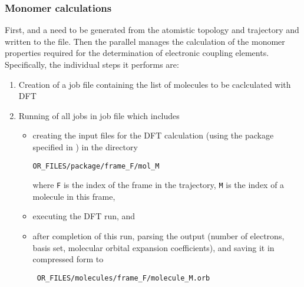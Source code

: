 \subsubsection{Monomer calculations}
\label{sec:edft}
First,  and a  need to be generated from the atomistic topology and trajectory and written to the \sqlstate file. Then the parallel  \calculator manages the calculation of the monomer properties required for the determination of electronic coupling elements. Specifically, the individual steps it performs are:
%
\begin{enumerate}
\item Creation of a job file containing the list of molecules to be caclculated with DFT 
\item Running of all jobs in job file 
which includes
\begin{itemize}
\item creating the input files for the DFT calculation (using the package specified in \xmloptions) in the directory 
\begin{verbatim}
OR_FILES/package/frame_F/mol_M
\end{verbatim}
where {\tt F} is the index of the frame in the trajectory, {\tt M} is the index of a molecule in this frame,
\item executing the DFT run, and
\item after completion of this run, parsing the output (number of electrons, basis set, molecular orbital expansion coefficients), and saving it in compressed form to 
\begin{verbatim}
 OR_FILES/molecules/frame_F/molecule_M.orb 
\end{verbatim}
\end{itemize}
\end{enumerate}


